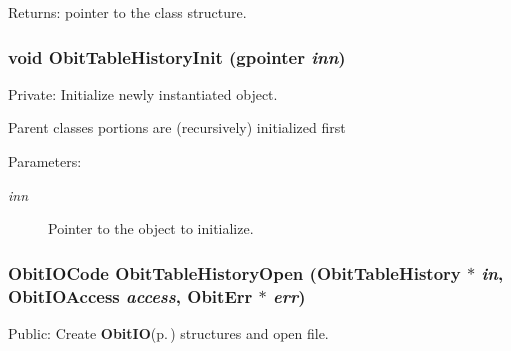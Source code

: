\begin{Desc}
\item[Returns:]pointer to the class structure. \end{Desc}
\subsubsection{\setlength{\rightskip}{0pt plus 5cm}void Obit\-Table\-History\-Init (gpointer {\em inn})}\label{ObitTableHistory_8c_a8}


Private: Initialize newly instantiated object. 

Parent classes portions are (recursively) initialized first \begin{Desc}
\item[Parameters:]
\begin{description}
\item[{\em inn}]Pointer to the object to initialize. \end{description}
\end{Desc}
\subsubsection{\setlength{\rightskip}{0pt plus 5cm}Obit\-IOCode Obit\-Table\-History\-Open ({\bf Obit\-Table\-History} $\ast$ {\em in}, Obit\-IOAccess {\em access}, {\bf Obit\-Err} $\ast$ {\em err})}\label{ObitTableHistory_8c_a21}


Public: Create {\bf Obit\-IO}{\rm (p.\,\pageref{structObitIO})} structures and open file. 

